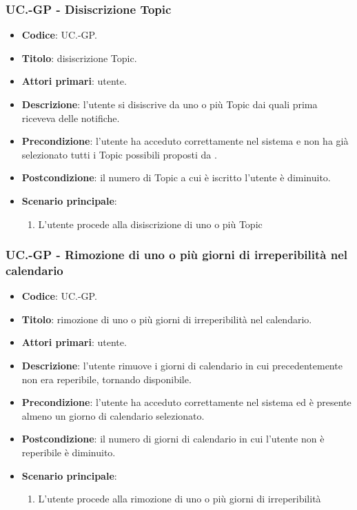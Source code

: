 	\subsubsection{UC\theuccount.\thesubuccount-GP - Disiscrizione Topic}
		
		\begin{itemize}
			\item \textbf{Codice}: UC\theuccount.\thesubuccount-GP.
			\item \textbf{Titolo}: disiscrizione Topic.
			\item \textbf{Attori primari}: utente.
			\item \textbf{Descrizione}: l’utente si disiscrive da uno o più Topic dai quali prima riceveva delle notifiche.
			\item \textbf{Precondizione}: l’utente ha acceduto correttamente nel sistema e non ha già selezionato tutti i Topic possibili proposti da \progetto.
			\item \textbf{Postcondizione}: il numero di Topic a cui è iscritto l’utente è diminuito.
			\item \textbf{Scenario principale}:
			\begin{enumerate}
				\item L'utente procede alla disiscrizione di uno o più Topic
			\end{enumerate}
		\end{itemize}
	
	\subsubsection{UC\theuccount.\thesubuccount-GP - Rimozione di uno o più giorni di irreperibilità nel calendario}
	
	\begin{itemize}
		\item \textbf{Codice}: UC\theuccount.\thesubuccount-GP.
		\item \textbf{Titolo}: rimozione di uno o più giorni di irreperibilità nel calendario.
		\item \textbf{Attori primari}: utente.
		\item \textbf{Descrizione}: l’utente rimuove i giorni di calendario in cui precedentemente	non era reperibile, tornando disponibile.
		\item \textbf{Precondizione}: l’utente ha acceduto correttamente nel sistema ed è presente almeno un giorno di calendario selezionato.
		\item \textbf{Postcondizione}: il numero di giorni di calendario in cui l’utente non è reperibile è diminuito.
		\item \textbf{Scenario principale}:
		\begin{enumerate}
			\item L'utente procede alla rimozione di uno o più giorni di irreperibilità
		\end{enumerate}
	\end{itemize}
	
